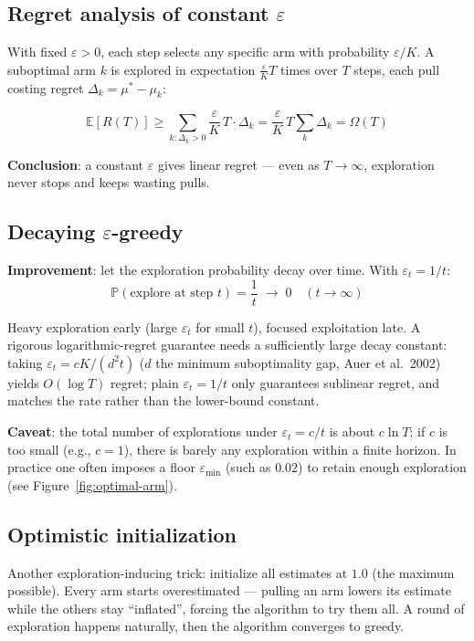 \documentclass{article}
\begin{document}
\subsection*{Regret analysis of constant $\varepsilon$}

With fixed $\varepsilon > 0$, each step selects any specific arm with probability $\varepsilon/K$. A suboptimal arm $k$ is explored in expectation $\frac{\varepsilon}{K}T$ times over $T$ steps, each pull costing regret $\Delta_k = \mu^* - \mu_k$:

\[
\mathbb{E}[R(T)] \ge \sum_{k: \Delta_k > 0} \frac{\varepsilon}{K}\,T \cdot \Delta_k = \frac{\varepsilon}{K}\,T\sum_k \Delta_k = \Omega(T)
\]

\textbf{Conclusion}: a constant $\varepsilon$ gives linear regret --- even as $T \to \infty$, exploration never stops and keeps wasting pulls.

\subsection*{Decaying $\varepsilon$-greedy}

\textbf{Improvement}: let the exploration probability decay over time. With $\varepsilon_t = 1/t$:
\[
\mathbb{P}(\text{explore at step } t) = \frac{1}{t} \;\longrightarrow\; 0 \quad (t \to \infty)
\]

Heavy exploration early (large $\varepsilon_t$ for small $t$), focused exploitation late. A rigorous logarithmic-regret guarantee needs a sufficiently large decay constant: taking $\varepsilon_t = cK/(d^2t)$ ($d$ the minimum suboptimality gap, Auer et al.\ 2002) yields $O(\log T)$ regret; plain $\varepsilon_t = 1/t$ only guarantees sublinear regret, and matches the rate rather than the lower-bound constant.

\textbf{Caveat}: the total number of explorations under $\varepsilon_t = c/t$ is about $c\ln T$; if $c$ is too small (e.g., $c=1$), there is barely any exploration within a finite horizon. In practice one often imposes a floor $\varepsilon_{\min}$ (such as $0.02$) to retain enough exploration (see Figure~\ref{fig:optimal-arm}).

\subsection*{Optimistic initialization}

Another exploration-inducing trick: initialize all estimates at $1.0$ (the maximum possible). Every arm starts overestimated --- pulling an arm lowers its estimate while the others stay ``inflated'', forcing the algorithm to try them all. A round of exploration happens naturally, then the algorithm converges to greedy.
\end{document}
